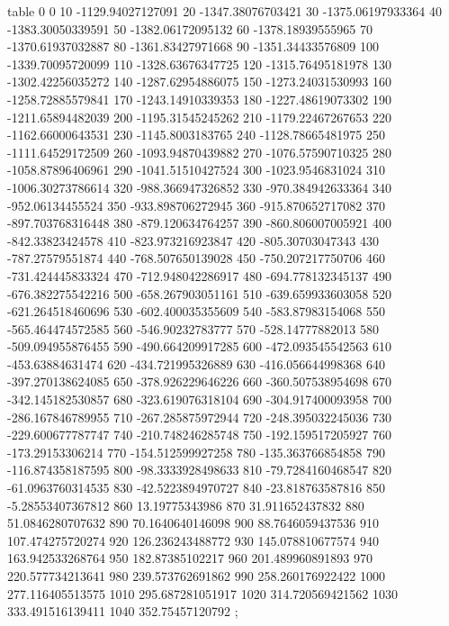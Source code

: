 table {%
0 0
10 -1129.94027127091
20 -1347.38076703421
30 -1375.06197933364
40 -1383.30050339591
50 -1382.06172095132
60 -1378.18939555965
70 -1370.61937032887
80 -1361.83427971668
90 -1351.34433576809
100 -1339.70095720099
110 -1328.63676347725
120 -1315.76495181978
130 -1302.42256035272
140 -1287.62954886075
150 -1273.24031530993
160 -1258.72885579841
170 -1243.14910339353
180 -1227.48619073302
190 -1211.65894482039
200 -1195.31545245262
210 -1179.22467267653
220 -1162.66000643531
230 -1145.8003183765
240 -1128.78665481975
250 -1111.64529172509
260 -1093.94870439882
270 -1076.57590710325
280 -1058.87896406961
290 -1041.51510427524
300 -1023.9546831024
310 -1006.30273786614
320 -988.366947326852
330 -970.384942633364
340 -952.06134455524
350 -933.898706272945
360 -915.870652717082
370 -897.703768316448
380 -879.120634764257
390 -860.806007005921
400 -842.33823424578
410 -823.973216923847
420 -805.30703047343
430 -787.27579551874
440 -768.507650139028
450 -750.207217750706
460 -731.424445833324
470 -712.948042286917
480 -694.778132345137
490 -676.382275542216
500 -658.267903051161
510 -639.659933603058
520 -621.264518460696
530 -602.400035355609
540 -583.87983154068
550 -565.464474572585
560 -546.90232783777
570 -528.14777882013
580 -509.094955876455
590 -490.664209917285
600 -472.093545542563
610 -453.63884631474
620 -434.721995326889
630 -416.056644998368
640 -397.270138624085
650 -378.926229646226
660 -360.507538954698
670 -342.145182530857
680 -323.619076318104
690 -304.917400093958
700 -286.167846789955
710 -267.285875972944
720 -248.395032245036
730 -229.600677787747
740 -210.748246285748
750 -192.159517205927
760 -173.29153306214
770 -154.512599927258
780 -135.363766854858
790 -116.874358187595
800 -98.3333928498633
810 -79.7284160468547
820 -61.0963760314535
830 -42.5223894970727
840 -23.818763587816
850 -5.28553407367812
860 13.19775343986
870 31.911652437832
880 51.0846280707632
890 70.1640640146098
900 88.7646059437536
910 107.474275720274
920 126.236243488772
930 145.078810677574
940 163.942533268764
950 182.87385102217
960 201.489960891893
970 220.577734213641
980 239.573762691862
990 258.260176922422
1000 277.116405513575
1010 295.687281051917
1020 314.720569421562
1030 333.491516139411
1040 352.75457120792
};

